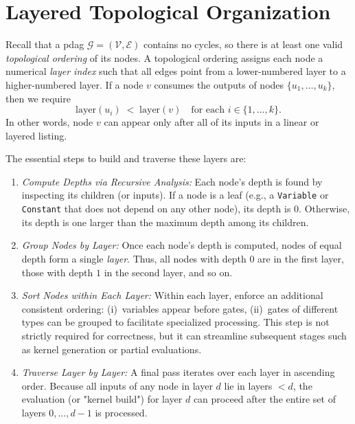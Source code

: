 
\section{Layered Topological Organization}
\label{sec:layered_dag_traversal}

Recall that a \acrshort{pdag} \(\mathcal{G} = (\mathcal{V}, \mathcal{E})\) contains no cycles, so there is at least one valid \emph{topological ordering} of its nodes.  A topological ordering assigns each node a numerical \emph{layer index} such that all edges point from a lower-numbered layer to a higher-numbered layer. If a node \(v\) consumes the outputs of nodes \(\{u_1,\dots,u_k\}\), then we require
\[
\text{layer}(u_i) \;<\; \text{layer}(v)
\quad
\text{for each }i\in\{1,\dots,k\}.
\]
In other words, node \(v\) can appear only after all of its inputs in a linear or layered listing.

The essential steps to build and traverse these layers are:

\begin{enumerate}
    \item \emph{Compute Depths via Recursive Analysis:}  
      Each node's depth is found by inspecting its children (or inputs).  If a node is a leaf (e.g., a \texttt{Variable} or \texttt{Constant} that does not depend on any other node), its depth is 0.  Otherwise, its depth is one larger than the maximum depth among its children.  

    \item \emph{Group Nodes by Layer:}  
      Once each node's depth is computed, nodes of equal depth form a single \emph{layer}. Thus, all nodes with depth \(0\) are in the first layer, those with depth \(1\) in the second layer, and so on.  

    \item \emph{Sort Nodes within Each Layer:}  
      Within each layer, enforce an additional consistent ordering: (i)~variables appear before gates, (ii)~gates of different types can be grouped to facilitate specialized processing.  This step is not strictly required for correctness, but it can streamline subsequent stages such as kernel generation or partial evaluations.

    \item \emph{Traverse Layer by Layer:}  
      A final pass iterates over each layer in ascending order.  Because all inputs of any node in layer \(d\) lie in layers \(< d\), the evaluation (or "kernel build") for layer \(d\) can proceed after the entire set of layers \(0,\dots,d-1\) is processed.
\end{enumerate}


